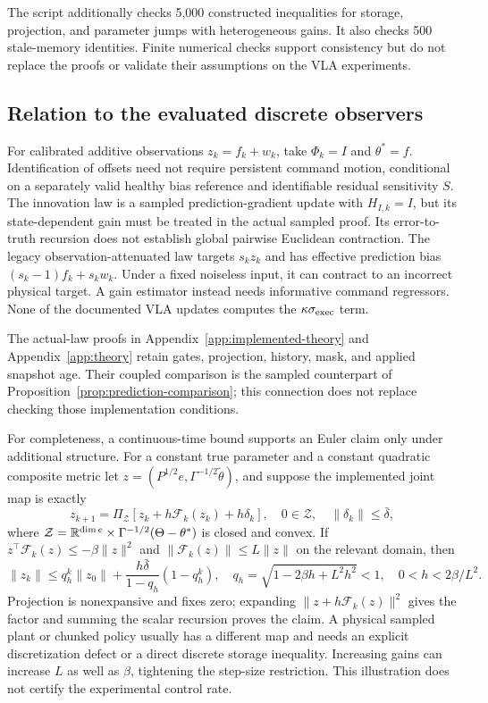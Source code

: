 The script additionally checks 5,000 constructed inequalities for storage,
projection, and parameter jumps with heterogeneous gains. It also checks
500 stale-memory identities.
Finite numerical checks support consistency but do not replace the proofs
or validate their assumptions on the VLA experiments.

\subsection{Relation to the evaluated discrete observers}
\label{app:gen-discrete}
For calibrated additive observations $z_k=f_k+w_k$, take
$\Phi_k=I$ and $\theta^*=f$. Identification of offsets need not require
persistent command motion, conditional on a separately valid healthy
bias reference and identifiable residual sensitivity $S$. The innovation
law is a sampled prediction-gradient update with $H_{I,k}=I$, but its
state-dependent gain must be treated in the actual sampled proof. Its
error-to-truth recursion does not establish global pairwise Euclidean
contraction. The legacy observation-attenuated law targets $s_kz_k$ and
has effective prediction bias $(s_k-1)f_k+s_kw_k$. Under a fixed
noiseless input, it can contract to an incorrect physical target.
A gain estimator instead needs informative command regressors.
None of the documented VLA updates computes the $\kappa\sigma_{\rm exec}$ term.

The actual-law proofs in Appendix~\ref{app:implemented-theory} and
Appendix~\ref{app:theory} retain gates, projection, history, mask, and
applied snapshot age. Their coupled comparison is the sampled counterpart
of Proposition~\ref{prop:prediction-comparison}; this connection does not
replace checking those implementation conditions.

For completeness, a continuous-time bound supports an Euler claim only
under additional structure. For a constant true parameter and a constant
quadratic composite metric let
$z=(P^{1/2}e,\Gamma^{-1/2}\tilde\theta)$, and suppose the implemented
joint map is exactly
\begin{equation}
 z_{k+1}=\Pi_{\mathcal Z}[z_k+h\mathcal F_k(z_k)+h\delta_k],\quad
 0\in\mathcal Z,\quad \|\delta_k\|\le\bar\delta,
 \label{eq:gen-euler}
\end{equation}
where $\mathcal Z=\mathbb R^{\dim e}\times
\Gamma^{-1/2}(\Theta-\theta^*)$ is closed and convex. If
$z^\top\mathcal F_k(z)\le-\beta\|z\|^2$ and
$\|\mathcal F_k(z)\|\le L\|z\|$ on the relevant domain, then
\begin{equation}
 \|z_k\|\le q_h^k\|z_0\|+
 \frac{h\bar\delta}{1-q_h}(1-q_h^k),\quad
 q_h=\sqrt{1-2\beta h+L^2h^2}<1,
 \quad 0<h<2\beta/L^2.
 \label{eq:gen-euler-bound}
\end{equation}
Projection is nonexpansive and fixes zero; expanding
$\|z+h\mathcal F_k(z)\|^2$ gives the factor and summing the scalar
recursion proves the claim. A physical sampled plant or chunked policy
usually has a different map and needs an explicit discretization defect
or a direct discrete storage inequality. Increasing gains can increase
$L$ as well as $\beta$, tightening the step-size restriction. This
illustration does not certify the experimental control rate.
